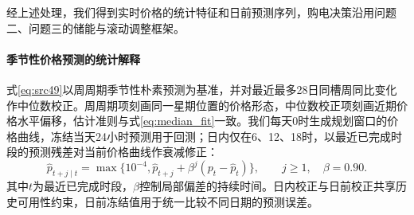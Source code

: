 经上述处理，我们得到实时价格的统计特征和日前预测序列，购电决策沿用问题二、问题三的储能与滚动调整框架。



\paragraph{季节性价格预测的统计解释}
式\eqref{eq:src49}以周周期季节性朴素预测为基准\cite{hyndman2021fpp}，并对最近最多28日同槽周同比变化作中位数校正。周周期项刻画同一星期位置的价格形态，中位数校正项刻画近期价格水平偏移，估计准则与式\eqref{eq:median_fit}一致。我们每天0时生成规划窗口的价格曲线，冻结当天24小时预测用于回测；日内仅在6、12、18时，以最近已完成时段的预测残差对当前价格曲线作衰减修正：
\begin{equation}\label{eq:price_update}
 \hat p_{t+j\mid t}=\max\{10^{-4},\hat p_{t+j}+\beta^j(p_t-\hat p_t)\},
 \qquad j\ge1,\quad\beta=0.90.
\end{equation}
其中$t$为最近已完成时段，$\beta$控制局部偏差的持续时间。日内校正与日前校正共享历史可用性约束，日前冻结值用于统一比较不同日期的预测误差。
